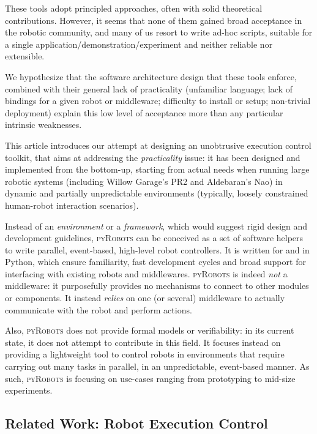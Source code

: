 \documentclass[a4paper, 10pt, conference]{ieeeconf}      %
\newcommand{\pyRobots}{\textsc{pyRobots}}
\begin{document}
These tools adopt principled approaches, often with solid theoretical
contributions. However, it seems that none of them gained broad acceptance in
the robotic community, and many of us resort to write ad-hoc scripts, suitable
for a single application/demonstration/experiment and neither reliable nor
extensible.

We hypothesize that the software architecture design that these tools enforce,
combined with their general lack of practicality (unfamiliar language; lack of
bindings for a given robot or middleware; difficulty to install or setup;
non-trivial deployment) explain this low level of acceptance more than any
particular intrinsic weaknesses.

This article introduces our attempt at designing an unobtrusive execution
control toolkit, that aims at addressing the \emph{practicality} issue: it has
been designed and implemented from the bottom-up, starting from actual needs
when running large robotic systems (including Willow Garage's PR2 and
Aldebaran's Nao) in dynamic and partially unpredictable environments (typically,
loosely constrained human-robot interaction scenarios).

Instead of an \emph{environment} or a \emph{framework}, which would suggest
rigid design and development guidelines, \pyRobots{} can be conceived as a set
of software helpers to write parallel, event-based, high-level robot
controllers.  It is written for and in Python, which ensure familiarity, fast
development cycles and broad support for interfacing with existing robots and
middlewares. \pyRobots{} is indeed \emph{not} a middleware: it purposefully
provides no mechanisms to connect to other modules or components. It instead
\emph{relies} on one (or several) middleware to actually communicate with the
robot and perform actions.

Also, \pyRobots{} does not provide formal models or verifiability: in its
current state, it does not attempt to contribute in this field. It focuses
instead on providing a lightweight tool to control robots in environments that
require carrying out many tasks in parallel, in an unpredictable, event-based
manner. As such, \pyRobots{} is focusing on use-cases ranging from prototyping
to mid-size experiments.

\subsection{Related Work: Robot Execution Control}
\end{document}
